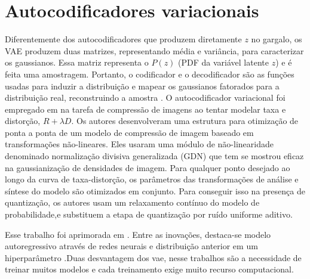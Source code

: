 
\section{Autocodificadores variacionais}



Diferentemente dos autocodificadores que produzem diretamente $z$ no gargalo, os VAE produzem duas matrizes, representando média e variância, para caracterizar os gaussianos. Essa matriz representa o $P(z)$ (PDF da variável latente $z$) e é feita uma amostragem. Portanto, o codificador e o decodificador são as funções usadas para induzir a distribuição e mapear os gaussianos fatorados para a distribuição real, reconstruindo a amostra \cite{DeliverableSeptember}. 
O autocodificador variacional foi empregado em  \cite{End2016Balle} na tarefa de compressão de imagens ao tentar modelar taxa e distorção, $R +\lambda D$. Os autores desenvolveram uma estrutura para otimização de ponta a ponta de um modelo de compressão de imagem baseado em transformações não-lineares.
Eles usaram uma módulo de não-linearidade denominado normalização divisiva generalizada (GDN) que tem se mostrou eficaz na gaussianização de densidades de imagem. 
Para qualquer ponto desejado ao longo da curva de taxa-distorção, os parâmetros das transformações de análise e síntese do modelo são otimizados em conjunto.
Para conseguir isso na presença de quantização, os autores usam  um relaxamento contínuo do modelo de probabilidade,e substituem a etapa de quantização por ruído uniforme aditivo. 

Esse trabalho foi aprimorada em  \cite{Variational2018Balle,Autoregressive2018Minnen}. Entre as inovações, destaca-se modelo autoregressivo através de redes neurais \cite{Autoregressive2018Minnen} e  distribuição anterior em um hiperparâmetro \cite{Autoregressive2018Minnen,Variational2018Balle}.Duas desvantagem dos \acrshort{vae}, nesse trabalhos são a necessidade de treinar muitos modelos e cada treinamento exige muito recurso computacional. 
 

